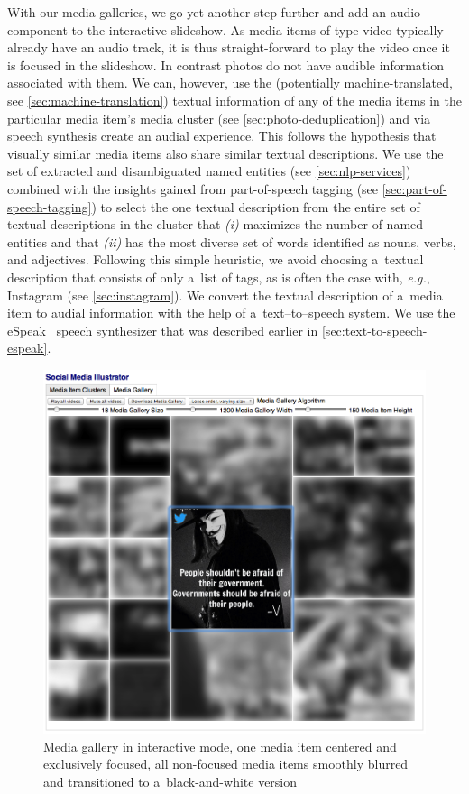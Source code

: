 With our media galleries, we go yet another step further
and add an audio component to the interactive slideshow.
As media items of type video typically already have an audio track,
it is thus straight-forward to play the video once it is focused
in the slideshow.
In contrast photos do not have audible information associated with them.
We can, however, use the (potentially machine-translated,
see \autoref{sec:machine-translation}) textual information
of any of the media items in the particular media item's media cluster
(see \autoref{sec:photo-deduplication})
and via speech synthesis create an audial experience.
This follows the hypothesis that visually similar media items 
also share similar textual descriptions.
We use the set of extracted and disambiguated named entities
(see \autoref{sec:nlp-services}) combined with
the insights gained from part-of-speech tagging
(see \autoref{sec:part-of-speech-tagging})
to select the one textual description
from the entire set of textual descriptions in the cluster
that \textit{(i)} maximizes the number of named entities
and that \textit{(ii)} has the most diverse set of words
identified as nouns, verbs, and adjectives.
Following this simple heuristic, we avoid choosing
a~textual description that consists of only a~list of tags,
as is often the case with, \emph{e.g.},
Instagram (see \autoref{sec:instagram}).
We convert the textual description of a~media item
to audial information with the help of a~text--to--speech system.
We use the eSpeak~\cite{duddington2012espeak} speech synthesizer
that was described earlier in \autoref{sec:text-to-speech-espeak}.

\begin{figure}[htb]
  \centering
  \includegraphics[width=1\columnwidth]{occupygezi1.png}
  \caption[Media gallery in interactive mode]{Media gallery in interactive mode, one media item centered and exclusively focused, all non-focused media items smoothly blurred and transitioned to a~black-and-white version}
  \label{fig:occupygezi1}
\end{figure}

